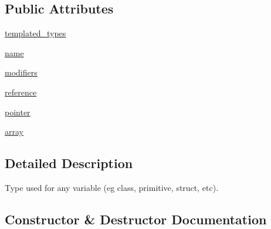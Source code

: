 \subsection*{Public Attributes}
\begin{DoxyCompactItemize}
\item 
\mbox{\hyperlink{classgoogletest-master_1_1googlemock_1_1scripts_1_1generator_1_1cpp_1_1ast_1_1_type_a48357bb38b624eb49b31a87682f53ab1}{templated\+\_\+types}}
\item 
\mbox{\hyperlink{classgoogletest-master_1_1googlemock_1_1scripts_1_1generator_1_1cpp_1_1ast_1_1_type_aacbabcf2a987fb5bcb3701866cb668f8}{name}}
\item 
\mbox{\hyperlink{classgoogletest-master_1_1googlemock_1_1scripts_1_1generator_1_1cpp_1_1ast_1_1_type_a719db4802c866ccf3210d3221b6538a8}{modifiers}}
\item 
\mbox{\hyperlink{classgoogletest-master_1_1googlemock_1_1scripts_1_1generator_1_1cpp_1_1ast_1_1_type_ae619cbc25bb7788fb83ef9bb776e0b22}{reference}}
\item 
\mbox{\hyperlink{classgoogletest-master_1_1googlemock_1_1scripts_1_1generator_1_1cpp_1_1ast_1_1_type_af2098cdcf3f1a24c67c9a2023bf91045}{pointer}}
\item 
\mbox{\hyperlink{classgoogletest-master_1_1googlemock_1_1scripts_1_1generator_1_1cpp_1_1ast_1_1_type_aefefd9749448a638c075150028f7e3bf}{array}}
\end{DoxyCompactItemize}


\subsection{Detailed Description}
\begin{DoxyVerb}Type used for any variable (eg class, primitive, struct, etc).\end{DoxyVerb}
 

\subsection{Constructor \& Destructor Documentation}
\mbox{\label{classgoogletest-master_1_1googlemock_1_1scripts_1_1generator_1_1cpp_1_1ast_1_1_type_aa5585d2dc23a720945a39c92fcf7c68f}} 
